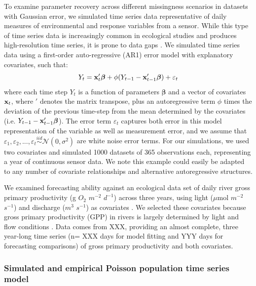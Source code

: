 \documentclass{article}
\begin{document}

To examine parameter recovery across different missingness scenarios in datasets with Gaussian error, we simulated time series data representative of daily measures of environmental and response variables from a sensor. While this type of time series data is increasingly common in ecological studies and produces high-resolution time series, it is prone to data gaps \citep{chen2013ecological}. We simulated time series data using a first-order auto-regressive (AR1) error model with explanatory covariates, such that:
\begin{equation}
    Y_t = {\bf x}_t'{\bm \beta} + \phi (Y_{t-1} - {\bf x}_{t-1}'{\bm \beta}) + \varepsilon_t
\label{eq:ar1}
\end{equation}
where each time step \(Y_t\) is a function of parameters \(\bm \beta\) and a vector of covariates \({\bf x}_t\), where $'$ denotes the matrix transpose, plus an autoregressive term \(\phi\) times the deviation of the previous time-step from the mean determined by the covariates (i.e. $Y_{t-1} - {\bf x}_{t-1}'{\bm \beta}$). The error term \(\varepsilon_t\) captures both error in this model representation of the variable as well as measurement error, and we assume that $\varepsilon_1, \varepsilon_2,..., \varepsilon_t \overset{iid}{\sim} \mathcal{N}(0, \sigma^2)$ are white noise error terms. For our simulations, we used two covariates and simulated 1000 datasets of 365 observations each, representing a year of continuous sensor data. We note this example could easily be adapted to any number of covariate relationships and alternative autoregressive structures.


We examined forecasting ability against an ecological data set of daily river gross primary productivity (g \(O_2\) \(m^{-2}\) \(d^{-1}\)) across three years, using light (\(\mu\)mol \(m^{-2}\) \(s^{-1}\)) and discharge (\(m^{3}\) \(s^{-1}\)) as covariates \citep{hall_turbidity_2015}. We selected these covariates because gross primary productivity (GPP) in rivers is largely determined by light and flow conditions \citep{bernhardt_metabolic_2018}. Data comes from XXX, providing an almost complete, three year-long time series (n= XXX days for model fitting and YYY days for forecasting comparisons) of gross primary productivity and both covariates.

\subsubsection*{Simulated and empirical Poisson population time series model}
\end{document}
